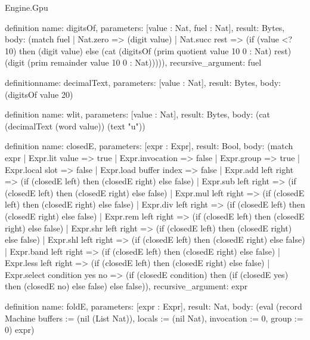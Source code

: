 \begin{lexlean}{Engine.Gpu}
\begin{semanticmodule}
definition{
  name: digitsOf,
  parameters: [value : Nat, fuel : Nat],
  result: Bytes,
  body: (match fuel
    | Nat.zero => (digit value)
    | Nat.succ rest => (if (value <? 10) then (digit value) else (cat (digitsOf (prim quotient value 10 0 : Nat) rest) (digit (prim remainder value 10 0 : Nat))))),
  recursive_argument: fuel
}

definition{name: decimalText, parameters: [value : Nat], result: Bytes, body: (digitsOf value 20)}

definition{
  name: wlit,
  parameters: [value : Nat],
  result: Bytes,
  body: (cat (decimalText (word value)) (text "u"))
}

definition{
  name: closedE,
  parameters: [expr : Expr],
  result: Bool,
  body: (match expr
    | Expr.lit value => true
    | Expr.invocation => false
    | Expr.group => true
    | Expr.local slot => false
    | Expr.load buffer index => false
    | Expr.add left right => (if (closedE left) then (closedE right) else false)
    | Expr.sub left right => (if (closedE left) then (closedE right) else false)
    | Expr.mul left right => (if (closedE left) then (closedE right) else false)
    | Expr.div left right => (if (closedE left) then (closedE right) else false)
    | Expr.rem left right => (if (closedE left) then (closedE right) else false)
    | Expr.shr left right => (if (closedE left) then (closedE right) else false)
    | Expr.shl left right => (if (closedE left) then (closedE right) else false)
    | Expr.band left right => (if (closedE left) then (closedE right) else false)
    | Expr.less left right => (if (closedE left) then (closedE right) else false)
    | Expr.select condition yes no => (if (closedE condition) then (if (closedE yes) then (closedE no) else false) else false)),
  recursive_argument: expr
}

definition{
  name: foldE,
  parameters: [expr : Expr],
  result: Nat,
  body: (eval (record Machine {buffers := (nil (List Nat)), locals := (nil Nat), invocation := 0, group := 0}) expr)
}


\end{semanticmodule}
\end{lexlean}
